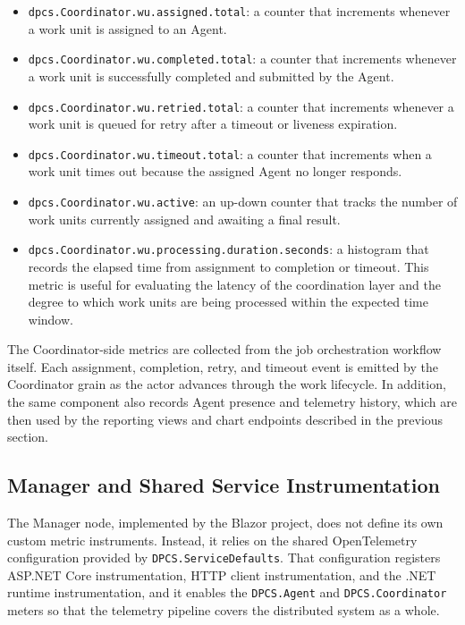 \begin{itemize}
    \item \verb|dpcs.Coordinator.wu.assigned.total|: a counter that increments whenever a work unit is assigned to an Agent.

    \item \verb|dpcs.Coordinator.wu.completed.total|: a counter that increments whenever a work unit is successfully completed and submitted by the Agent.

    \item \verb|dpcs.Coordinator.wu.retried.total|: a counter that increments whenever a work unit is queued for retry after a timeout or liveness expiration.

    \item \verb|dpcs.Coordinator.wu.timeout.total|: a counter that increments when a work unit times out because the assigned Agent no longer responds.

    \item \verb|dpcs.Coordinator.wu.active|: an up-down counter that tracks the number of work units currently assigned and awaiting a final result.

    \item \verb|dpcs.Coordinator.wu.processing.duration.seconds|: a histogram that records the elapsed time from assignment to completion or timeout. This metric is useful for evaluating the latency of the coordination layer and the degree to which work units are being processed within the expected time window.
\end{itemize}

The Coordinator-side metrics are collected from the job orchestration workflow itself. Each assignment, completion, retry, and timeout event is emitted by the Coordinator grain as the actor advances through the work lifecycle. In addition, the same component also records Agent presence and telemetry history, which are then used by the reporting views and chart endpoints described in the previous section.

\subsection{Manager and Shared Service Instrumentation}

The Manager node, implemented by the Blazor project, does not define its own custom metric instruments. Instead, it relies on the shared OpenTelemetry configuration provided by \verb|DPCS.ServiceDefaults|. That configuration registers ASP.NET Core instrumentation, HTTP client instrumentation, and the .NET runtime instrumentation, and it enables the \verb|DPCS.Agent| and \verb|DPCS.Coordinator| meters so that the telemetry pipeline covers the distributed system as a whole.

